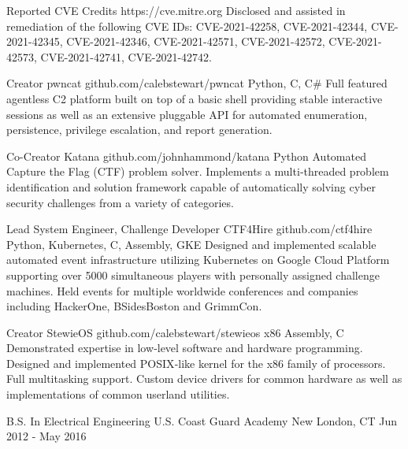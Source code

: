 \documentclass[11pt, letterpaper]{awesome-cv}
\begin{document}
\begin{cventries}

  \cventry
    {Reported}
    {CVE Credits}
    {https://cve.mitre.org}
    {}
    {Disclosed and assisted in remediation of the following CVE IDs: CVE-2021-42258, CVE-2021-42344, CVE-2021-42345, CVE-2021-42346, CVE-2021-42571, CVE-2021-42572, CVE-2021-42573, CVE-2021-42741, CVE-2021-42742.}

  \cventry
    {Creator}
    {pwncat}
    {github.com/calebstewart/pwncat}
    {Python, C, C\#}
    {Full featured agentless C2 platform built on top of a basic shell providing stable interactive sessions as well as an extensive pluggable API for automated enumeration, persistence, privilege escalation, and report generation.}

  \cventry
    {Co-Creator}
    {Katana}
    {github.com/johnhammond/katana}
    {Python}
    {Automated Capture the Flag (CTF) problem solver. Implements a multi‑threaded problem identification and solution framework capable of automatically solving cyber security challenges from a variety of categories.}

  \cventry
    {Lead System Engineer, Challenge Developer}
    {CTF4Hire}
    {github.com/ctf4hire}
    {Python, Kubernetes, C, Assembly, GKE}
    {Designed and implemented scalable automated event infrastructure utilizing Kubernetes on Google Cloud Platform supporting over 5000 simultaneous players with personally assigned challenge machines. Held events for multiple worldwide conferences and companies including HackerOne, BSidesBoston and GrimmCon.}

  \cventry
    {Creator}
    {StewieOS}
    {github.com/calebstewart/stewieos}
    {x86 Assembly, C}
    {Demonstrated expertise in low‑level software and hardware programming. Designed and implemented POSIX‑like kernel for the x86 family of processors. Full multitasking support. Custom device drivers for common hardware as well as implementations of common userland utilities.}


\end{cventries}

\begin{cventries}

  \cventry
    {B.S. In Electrical Engineering}
    {U.S. Coast Guard Academy}
    {New London, CT}
    {Jun 2012 - May 2016}
    {
    }


\end{cventries}

\end{document}
